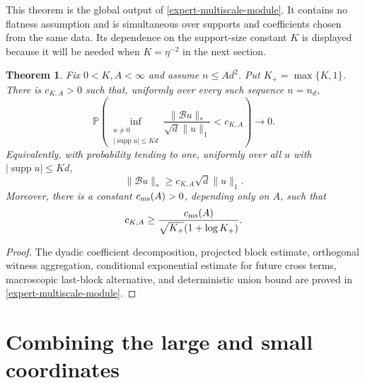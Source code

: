 \documentclass[11pt]{article}
\numberwithin{equation}{section}
\newtheorem{theorem}{Theorem}[section]
\theoremstyle{definition}
\theoremstyle{remark}
\newcommand{\Pp}{\mathbb P}
\newcommand{\1}{\boldsymbol 1}
\newcommand{\supp}{\operatorname{supp}}
\begin{document}
\begin{aiblock}

This theorem is the global output of
\cref{expert-multiscale-module}. It contains no flatness
assumption and is simultaneous over supports and
coefficients chosen from the same data. Its dependence on
the support-size constant $K$ is displayed because it
will be needed when $K=\eta^{-2}$ in the next section.

\begin{theorem}\label{the-clipped-head-theorem}
  Fix $0<K,A<\infty$ and assume $n\le Ad^2$. Put
  $K_+=\max\{K,1\}$. There is $c_{K,A}>0$ such that,
  uniformly over every such sequence $n=n_d$,
  \[
    \Pp\left( \inf_{\substack{u\ne0\\|\supp u|\le Kd}}
    \frac{\|\mathcal Bu\|_*}{\sqrt d\|u\|_1}<c_{K,A}
    \right)\longrightarrow0.
  \]
  Equivalently, with probability tending to one,
  uniformly over all $u$ with $|\supp u|\le Kd$,
  \[
    \|\mathcal Bu\|_*\ge c_{K,A}\sqrt d\|u\|_1.
  \]
  Moreover, there is a constant $c_{\rm ms}(A)>0$,
  depending only on $A$, such that
  \[
    c_{K,A}\ge\frac{c_{\rm ms}(A)}{\sqrt{K_+}(1+\log
    K_+)}.
  \]
\end{theorem}

\begin{proof}
  The dyadic coefficient decomposition, projected block
  estimate, orthogonal witness aggregation, conditional
  exponential estimate for future cross terms,
  macroscopic last-block alternative, and deterministic
  union bound are proved in
  \cref{expert-multiscale-module}.
\end{proof}

 \end{aiblock}
\section{Combining the large and small
  coordinates}\label{exact-clipping-and-the-mixed-modulus}
\end{document}
